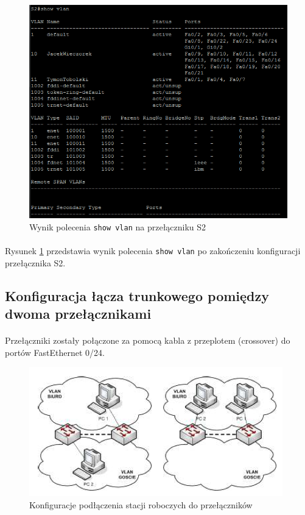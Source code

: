 \documentclass[wide,a4paper,titlepage,12pt] {article}
\begin{document}
  \begin{figure}[H]
    \begin{center}
      \includegraphics[width=\textwidth]{img/t8.PNG}
      \caption{Wynik polecenia \texttt{show vlan} na przełączniku S2}
      \label{fig:t8}
    \end{center}
  \end{figure}

  \paragraph{}
  Rysunek \ref{fig:t8} przedstawia wynik polecenia \texttt{show vlan} po zakończeniu konfiguracji przełącznika S2.

  \subsection{Konfiguracja łącza trunkowego pomiędzy dwoma przełącznikami}
  \paragraph{}
  Przełączniki zostały połączone za pomocą kabla z przeplotem (crossover) do portów FastEthernet 0/24.

  \begin{figure}[H]
    \begin{center}
      \includegraphics[width=\textwidth]{img/bb.PNG}
      \caption{Konfiguracje podłączenia stacji roboczych do przełączników}
      \label{fig:bb}
    \end{center}
  \end{figure}
\end{document}
